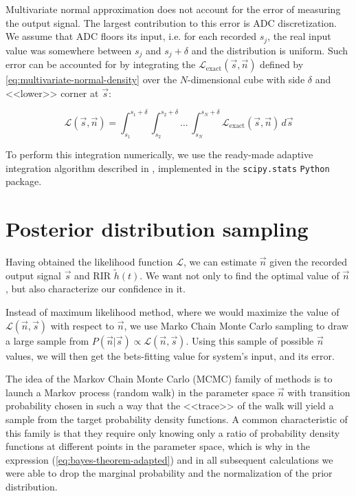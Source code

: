 Multivariate normal approximation does not account for the error of measuring the output signal. The largest contribution to this error is ADC discretization. We assume that ADC floors its input, i.e. for each recorded $s_j$, the real input value was somewhere between $s_j$ and $s_j + \delta$ and the distribution is uniform. Such error can be accounted for by integrating the $\mathcal{L}_{\mathrm{exact}}(\vec{s}, \vec{n})$ defined by \ref{eq:multivariate-normal-density} over the $N$-dimensional cube with side $\delta$ and <<lower>> corner at $\vec{s}$:

\begin{equation}
	\label{eq:likelihood-with-error-uniform-error}
	\mathcal{L}(\vec{s}, \vec{n}) = \int_{s_1}^{s_1 + \delta} \int_{s_2}^{s_2 + \delta} \ldots \, \int_{s_{N}}^{s_N + \delta} \mathcal{L}_{\mathrm{exact}}(\vec{s}, \vec{n}) \, d\vec{s}
\end{equation}

To perform this integration numerically, we use the ready-made adaptive integration algorithm described in \cite{Genz1992}, implemented in the \texttt{scipy.stats} \cite{2020SciPy-NMeth} \texttt{Python} package.


\section{Posterior distribution sampling}
\label{sec:mcmc-sampling}

Having obtained the likelihood function $\mathcal{L}$, we can estimate $\vec{n}$ given the recorded output signal $\vec{s}$ and RIR $\tilde{h}(t)$. We want not only to find the optimal value of $\vec{n}$, but also characterize our confidence in it.

Instead of maximum likelihood method, where we would maximize the value of $\mathcal{L}(\vec{n}, \vec{s})$ with respect to $\vec{n}$, we use Marko Chain Monte Carlo sampling to draw a large sample from $P(\vec{n} | \vec{s}) \propto \mathcal{L}(\vec{n}, \vec{s})$. Using this sample of possible $\vec{n}$ values, we will then get the bets-fitting value for system's input, and its error.

The idea of the Markov Chain Monte Carlo (MCMC) family of methods \cite{Sharma2017} is to launch a Markov process (random walk) in the parameter space $\vec{n}$ with transition probability chosen in such a way that the <<trace>> of the walk will yield a sample from the target probability density functions. A common characteristic of this family is that they require only knowing only a ratio of probability density functions at different points in the parameter space, which is why in the expression (\ref{eq:bayes-theorem-adapted}) and in all subsequent calculations we were able to drop the marginal probability and the normalization of the prior distribution.


